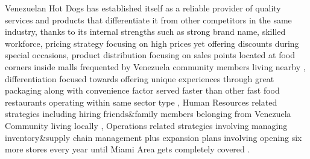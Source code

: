 Venezuelan Hot Dogs has established itself as a reliable provider of quality services and products that differentiate it from other competitors in the same industry, thanks to its internal strengths such as strong brand name, skilled workforce, pricing strategy focusing on high prices yet offering discounts during special occasions, product distribution focusing on sales points located at food corners inside malls frequented by Venezuela community members living nearby , differentiation focused towards offering unique experiences through great packaging along with convenience factor served faster than other fast food restaurants operating within same sector type , Human Resources related strategies including hiring friends&family members belonging from Venezuela Community living locally , Operations related strategies involving managing inventory&supply chain management plus expansion plans involving opening six more stores every year until Miami Area gets completely covered .